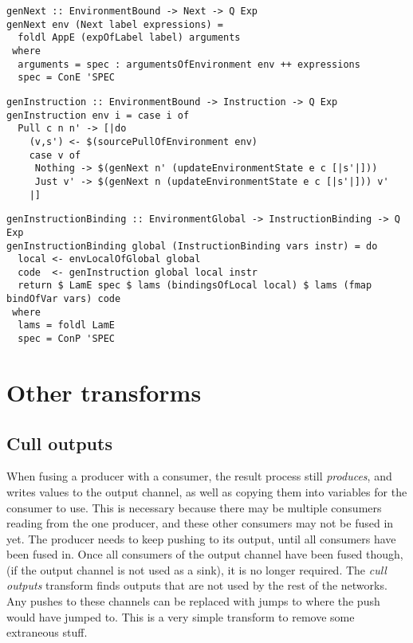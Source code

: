 \begin{lstlisting}
genNext :: EnvironmentBound -> Next -> Q Exp
genNext env (Next label expressions) =
  foldl AppE (expOfLabel label) arguments
 where
  arguments = spec : argumentsOfEnvironment env ++ expressions
  spec = ConE 'SPEC
\end{lstlisting}

\begin{lstlisting}
genInstruction :: EnvironmentBound -> Instruction -> Q Exp
genInstruction env i = case i of
  Pull c n n' -> [|do
    (v,s') <- $(sourcePullOfEnvironment env)
    case v of
     Nothing -> $(genNext n' (updateEnvironmentState e c [|s'|]))
     Just v' -> $(genNext n (updateEnvironmentState e c [|s'|])) v'
    |]
\end{lstlisting}

\begin{lstlisting}
genInstructionBinding :: EnvironmentGlobal -> InstructionBinding -> Q Exp
genInstructionBinding global (InstructionBinding vars instr) = do
  local <- envLocalOfGlobal global
  code  <- genInstruction global local instr
  return $ LamE spec $ lams (bindingsOfLocal local) $ lams (fmap bindOfVar vars) code
 where
  lams = foldl LamE
  spec = ConP 'SPEC
\end{lstlisting}

\section{Other transforms}
\subsection{Cull outputs}
When fusing a producer with a consumer, the result process still \emph{produces}, and writes values to the output channel, as well as copying them into variables for the consumer to use.
This is necessary because there may be multiple consumers reading from the one producer, and these other consumers may not be fused in yet.
The producer needs to keep pushing to its output, until all consumers have been fused in.
Once all consumers of the output channel have been fused though, (if the output channel is not used as a sink), it is no longer required.
The \emph{cull outputs} transform finds outputs that are not used by the rest of the networks.
Any pushes to these channels can be replaced with jumps to where the push would have jumped to.
This is a very simple transform to remove some extraneous stuff.


